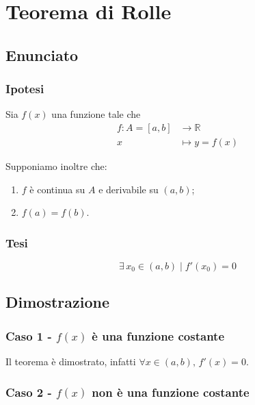 \documentclass[../../dimostrazioni]{subfiles}
\begin{document}
    \chapter{Teorema di Rolle}
    \label{teoRolle}

        \section*{Enunciato}

            \subsection*{Ipotesi}

                Sia \(f(x)\) una funzione tale che
                \begin{align*}
                    f : A = [a, b] &\longrightarrow \mathbb{R}\\
                    x &\longmapsto y = f(x) 
                \end{align*}

                Supponiamo inoltre che:

                \begin{enumerate}
                    \indentitem \item \(f\) è continua su \(A\) e derivabile su \((a, b)\);
                    \indentitem \item \(f(a) = f(b)\).
                \end{enumerate}

            \subsection*{Tesi}

                \[\exists \, x_0 \in (a,b) \; | \; f'(x_0) = 0 \]

        \section*{Dimostrazione}

            \subsection*{Caso 1 - \(f(x)\) è una funzione costante}

                Il teorema è dimostrato, infatti \(\forall x \in (a,b), \, f'(x) = 0\).

            \subsection*{Caso 2 - \(f(x)\) non è una funzione costante}
\end{document}
